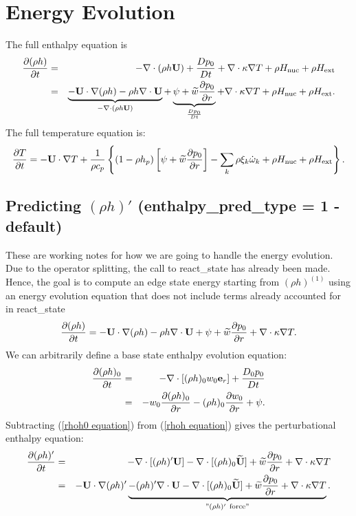 \documentclass[11pt]{article}
\def\eb    {{\bf e}}
\def\Ub    {{\bf U}}
\def\Ubt   {\widetilde{\bf U}}
\def\wt    {\widetilde{w}}
\begin{document}
\section{Energy Evolution}
The full enthalpy equation is
\begin{eqnarray}
\frac{\partial(\rho h)}{\partial t} &=& -\nabla\cdot(\rho h \Ub) + \frac{Dp_0}{Dt} 
+ \nabla\cdot\kappa\nabla T + \rho H_{\rm nuc} + \rho H_{\rm ext} \nonumber \\
&=& \underbrace{-\Ub\cdot\nabla(\rho h) - \rho h\nabla\cdot\Ub}_{-\nabla\cdot(\rho h\Ub)} 
+ \underbrace{\psi + \wt\frac{\partial p_0}{\partial r}}_{\frac{Dp_0}{Dt}} 
+ \nabla\cdot\kappa\nabla T + \rho H_{\rm nuc} + \rho H_{\rm ext}.
\end{eqnarray}
The full temperature equation is:
\begin{equation}
\frac{\partial T}{\partial t} = -\Ub\cdot\nabla T
+ \frac{1}{\rho c_p}\left\{(1-\rho h_p)\left[\psi
+ \wt\frac{\partial p_0}{\partial r}\right] - \sum_k\rho\xi_k\dot\omega_k 
+ \rho H_{\rm nuc} + \rho H_{\rm ext}\right\}.
\end{equation}
\subsection{Predicting $(\rho h)'$ (enthalpy\_pred\_type = 1 - default)}
These are working notes for how we are going to handle the energy evolution.  Due to the 
operator splitting, the call to react\_state has already been made.  Hence, the goal is to 
compute an edge state energy starting from $(\rho h)^{(1)}$ using an energy evolution 
equation that does not include terms already accounted for in react\_state
\begin{equation}
\frac{\partial(\rho h)}{\partial t} = -\Ub\cdot\nabla(\rho h) - \rho h\nabla\cdot\Ub 
+ \psi + \wt\frac{\partial p_0}{\partial r} + \nabla\cdot\kappa\nabla T. \label{rhoh equation}
\end{equation}
We can arbitrarily define a base state enthalpy evolution equation:
\begin{eqnarray}
\frac{\partial(\rho h)_0}{\partial t} &=& -\nabla\cdot[(\rho h)_0 w_0\eb_r] 
+ \frac{D_0p_0}{Dt} \nonumber \\
&=& -w_0\frac{\partial(\rho h)_0}{\partial r} - (\rho h)_0\frac{\partial w_0}{\partial r} 
+ \psi.\label{rhoh0 equation}
\end{eqnarray}
Subtracting (\ref{rhoh0 equation}) from (\ref{rhoh equation}) gives the perturbational 
enthalpy equation:
\begin{eqnarray}
\frac{\partial(\rho h)'}{\partial t} &=& -\nabla\cdot[(\rho h)'\Ub] 
- \nabla\cdot[(\rho h)_0\Ubt] + \wt\frac{\partial p_0}{\partial r} 
+ \nabla\cdot\kappa\nabla T\nonumber \\
&=& -\Ub\cdot\nabla(\rho h)' \underbrace{- (\rho h)'\nabla\cdot\Ub 
- \nabla\cdot[(\rho h)_0\Ubt] + \wt\frac{\partial p_0}{\partial r}
+ \nabla\cdot\kappa\nabla T}_{"(\rho h)' ~ \text{force}"}. \label{rhohprime equation}
\end{eqnarray}
\end{document}
